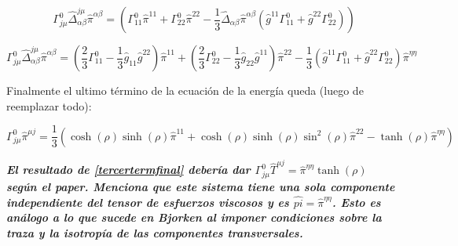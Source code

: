 \documentclass[11pt,a4paper]{article}
\begin{document}
\begin{equation}
\Gamma^{0}_{{j}{\mu}}\hat{\Delta}^{{j}{\mu}}_{{\alpha}{\beta}}\hat{\pi}^{{\alpha}{\beta}}=(\Gamma^{0}_{{1}{1}}\hat{\pi}^{{1}{1}} +\Gamma^{0}_{{2}{2}}\hat{\pi}^{{2}{2}}-\frac{1}{3}\hat{\Delta}_{{\alpha}{\beta}}\hat{\pi}^{{\alpha}{\beta}}(\hat{g}^{{1}{1}}\Gamma^{0}_{{1}{1}}+\hat{g}^{{2}{2}}\Gamma^{0}_{{2}{2}}))
\label{viscdesarr}
\end{equation}

\begin{equation}
\Gamma^{0}_{{j}{\mu}}\hat{\Delta}^{{j}{\mu}}_{{\alpha}{\beta}}\hat{\pi}^{{\alpha}{\beta}}=(\frac{2}{3}\Gamma^{0}_{{1}{1}}-\frac{1}{3}\hat{g}_{{1}{1}}\hat{g}^{{2}{2}})\hat{\pi}^{{1}{1}}+(\frac{2}{3}\Gamma^{0}_{{2}{2}}-\frac{1}{3}\hat{g}_{{2}{2}}\hat{g}^{{1}{1}})\hat{\pi}^{{2}{2}}-\frac{1}{3}(\hat{g}^{{1}{1}}\Gamma^{0}_{{1}{1}}+\hat{g}^{{2}{2}}\Gamma^{0}_{{2}{2}})\hat{\pi}^{{\eta}{\eta}}
\label{viscdesarrr}
\end{equation}


Finalmente el ultimo término de la ecuación de la energía queda (luego de reemplazar todo):

\begin{equation}
\Gamma^{0}_{{j}{\mu}}\hat{\pi}^{{\mu}{j}}=\frac{1}{3}(\cosh(\rho)\sinh(\rho)\hat{\pi}^{{1}{1}}+\cosh(\rho)\sinh(\rho)\sin^2(\rho)\hat{\pi}^{{2}{2}}-\tanh(\rho)\hat{\pi}^{{\eta}{\eta}})
\label{tercertermfinal}
\end{equation}

\textbf{\textit{El resultado de \ref{tercertermfinal} debería dar $\Gamma^{0}_{{j}{\mu}}\hat{T}^{{\mu}{j}}=\hat{\pi}^{{\eta}{\eta}}\tanh(\rho)$ según el paper. Menciona que este sistema tiene una sola componente independiente del tensor de esfuerzos viscosos y es $\hat{pi}=\hat{\pi}^{{\eta}{\eta}}$. Esto es análogo a lo que sucede en Bjorken al imponer condiciones sobre la traza y la isotropía de las componentes transversales.}}













\end{document}
